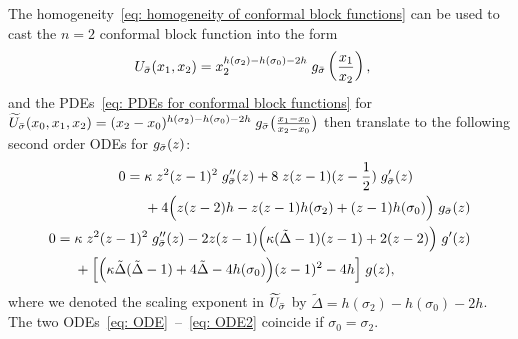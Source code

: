 \documentclass[oneside,english]{amsart}
\numberwithin{equation}{section}
\numberwithin{figure}{section}
\theoremstyle{plain}
\theoremstyle{plain}
\theoremstyle{plain}
\theoremstyle{remark}
\theoremstyle{plain}
\theoremstyle{plain}
\theoremstyle{plain}
\theoremstyle{plain}
\theoremstyle{plain}
\theoremstyle{plain}
\theoremstyle{plain}
\theoremstyle{plain}
\begin{document}
The homogeneity~\eqref{eq: homogeneity of conformal block functions}
can be used to cast the $n=2$ conformal block function into the form
\begin{align*}
U_{\bar{\sigma}}(x_{1},x_{2})=\; & x_{2}^{h(\sigma_{2})-h(\sigma_{0})-2h}\;g_{\bar{\sigma}}\left(\frac{x_{1}}{x_{2}}\right),
\end{align*}
and the PDEs~\eqref{eq: PDEs for conformal block functions} for $\widetilde{U}_{\bar{\sigma}}(x_{0},x_{1},x_{2})=(x_{2}-x_{0})^{h(\sigma_{2})-h(\sigma_{0})-2h}\;g_{\bar{\sigma}}\big(\frac{x_{1}-x_{0}}{x_{2}-x_{0}}\big)$
then translate to the following
second order ODEs for $g_{\bar{\sigma}}(z)$:
\begin{align} \label{eq: ODE}
\begin{split}
0=\; & \kappa\;z^{2}(z-1)^{2}\;g_{\bar{\sigma}}''(z)+8\;z(z-1)(z-\frac{1}{2})\;g_{\bar{\sigma}}'(z)\\
 & +4\Big(z(z-2)h-z(z-1)h(\sigma_{2})+(z-1)h(\sigma_{0})\Big)\;g_{\bar{\sigma}}(z)
 \end{split} \\
\label{eq: ODE2}
 \begin{split}
 0 = \; &  \kappa\;z^{2}(z-1)^{2}\;g_{\bar{\sigma}}''(z) - 2 z (z-1) \Big( \kappa ( \tilde{\Delta} -1 ) (z-1)  + 2 (z-2) \Big) \; g'(z) \\
 & + \Big[  \Big(\kappa \tilde{\Delta}(\tilde{\Delta} - 1) +  4 \tilde{\Delta} -4 h(\sigma_0) \Big) (z-1)^2 - 4h \Big] \; g(z),
\end{split}
\end{align}
where we denoted the scaling exponent in $\widetilde{U}_{\bar{\sigma}}$ by $ \tilde{\Delta} = h(\sigma_{2})-h(\sigma_{0})-2h$. The two ODEs~\eqref{eq: ODE}~--~\eqref{eq: ODE2} coincide if $\sigma_0 = \sigma_2$. %
\end{document}
